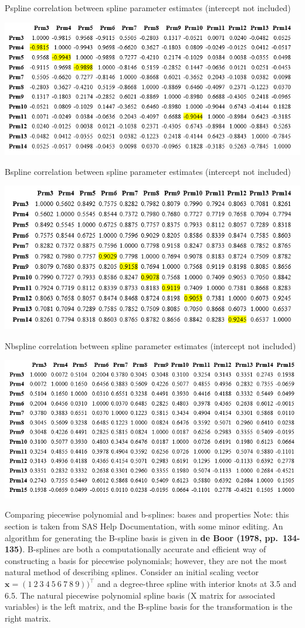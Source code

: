 \documentclass[
  9pt,
  ignorenonframetext,
]{beamer}
\begin{document}
\begin{frame}{}
\protect\hypertarget{section-19}{}
Pspline correlation between spline parameter estimates (intercept not
included)

\begin{center}\includegraphics[width=0.4\linewidth]{figs_L12/f21} \end{center}

Bspline correlation between spline parameter estimates (intercept not
included)

\begin{center}\includegraphics[width=0.4\linewidth]{figs_L12/f22} \end{center}

Nbspline correlation between spline parameter estimates (intercept not
included)

\begin{center}\includegraphics[width=0.4\linewidth]{figs_L12/f23} \end{center}
\end{frame}

\begin{frame}{Comparing piecewise polynomial and b-splines: bases and
properties}
\protect\hypertarget{comparing-piecewise-polynomial-and-b-splines-bases-and-properties}{}
Note: this section is taken from SAS Help Documentation, with some minor
editing. An algorithm for generating the B-spline basis is given in
\textbf{de Boor (1978, pp.~134-135)}. B-splines are both a
computationally accurate and efficient way of constructing a basis for
piecewise polynomials; however, they are not the most natural method of
describing splines. Consider an initial scaling vector
\(\pmb x=(1\ 2\ 3\ 4\ 5\ 6\ 7\ 8\ 9))^{\top}\) and a degree-three spline
with interior knots at 3.5 and 6.5. The natural piecewise polynomial
spline basis (X matrix for associated variables) is the left matrix, and
the B-spline basis for the transformation is the right matrix.
\end{frame}
\end{document}
